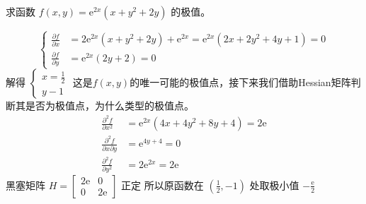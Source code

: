 \begin{exercise}
    求函数 $f(x, y)=\mathrm{e}^{2 x}\left(x+y^2+2 y\right)$ 的极值。
\end{exercise}
\begin{solution}
    \[\begin{cases}
        \frac{\partial f}{\partial x}&=2 \mathrm{e}^{2 x}\left(x+y^2+2 y\right)+\mathrm{e}^{2 x}=\mathrm{e}^{2 x}\left(2 x+2 y^2+4 y+1\right)=0\\
        \frac{\partial f}{\partial y}&=\mathrm{e}^{2 x}(2 y+2)=0
    \end{cases}\]
解得 $\left\{\begin{array}{l}x=\frac{1}{2} \\ y-1\end{array}\right.$ 这是$f(x,y)$的唯一可能的极值点，接下来我们借助Hessian矩阵判断其是否为极值点，为什么类型的极值点。
\begin{align*}
    \frac{\partial^2 f}{\partial x^2}&=\mathrm{e}^{2 x}\left(4 x+4 y^2+8 y+4\right)=2 \mathrm{e}\\
    \frac{\partial^2 f}{\partial x \partial y}&=\mathrm{e}^{4 y+4}=0 \\
    \frac{\partial^2 f}{\partial y^2}&=2 \mathrm{e}^{2 x}=2 \mathrm{e}
\end{align*}
黑塞矩阵 $H=\left[\begin{array}{cc}2 \mathrm{e} & 0 \\ 0 & 2 \mathrm{e}\end{array}\right]$ 正定
所以原函数在 $\left(\frac{1}{2},-1\right)$ 处取极小值 $-\frac{\mathrm{e}}{2}$
\end{solution}

